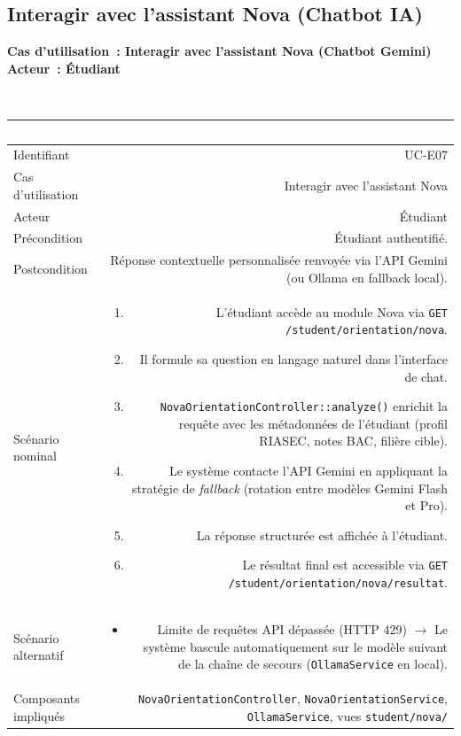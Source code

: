 \documentclass[a4paper,12pt]{article}
\newcommand{\ucheader}[2]{%
  \noindent\colorbox{capblue}{\parbox{\dimexpr\linewidth-2\fboxsep}{%
    \color{white}\bfseries\large Cas d'utilisation~: #1 \hfill \normalsize Acteur~: #2
  }}\\[2pt]
}
\begin{document}
\vspace{1em}

\subsection{Interagir avec l'assistant Nova (Chatbot IA)}
\ucheader{Interagir avec l'assistant Nova (Chatbot Gemini)}{Étudiant}

\noindent
\begin{tabular}{|L|R|}
\hline
{}\textcolor{white}{\textbf{Champ}} & \textcolor{white}{\textbf{Description}} \\
\hline
{}Identifiant & UC-E07 \\
\hline
Cas d'utilisation & Interagir avec l'assistant Nova \\
\hline
{}Acteur & Étudiant \\
\hline
Précondition & Étudiant authentifié. \\
\hline
{}Postcondition & Réponse contextuelle personnalisée renvoyée via l'API Gemini (ou Ollama en fallback local). \\
\hline
Scénario nominal &
\begin{enumerate}
  \item L'étudiant accède au module Nova via \texttt{GET /student/orientation/nova}.
  \item Il formule sa question en langage naturel dans l'interface de chat.
  \item \texttt{NovaOrientationController::analyze()} enrichit la requête avec les métadonnées de l'étudiant (profil RIASEC, notes BAC, filière cible).
  \item Le système contacte l'API Gemini en appliquant la stratégie de \textit{fallback} (rotation entre modèles Gemini Flash et Pro).
  \item La réponse structurée est affichée à l'étudiant.
  \item Le résultat final est accessible via \texttt{GET /student/orientation/nova/resultat}.
\end{enumerate} \\
\hline
{}Scénario alternatif &
\begin{itemize}
  \item Limite de requêtes API dépassée (HTTP 429) $\rightarrow$ Le système bascule automatiquement sur le modèle suivant de la chaîne de secours (\texttt{OllamaService} en local).
\end{itemize} \\
\hline
Composants impliqués & \texttt{NovaOrientationController}, \texttt{NovaOrientationService}, \texttt{OllamaService}, vues \texttt{student/nova/} \\
\hline
\end{tabular}
\end{document}

